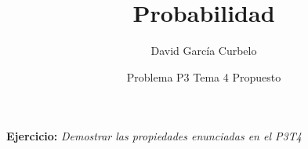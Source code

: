 \documentclass[fleqn]{article}
\author{David García Curbelo}
\title{Probabilidad}
\date{Problema P3 Tema 4 Propuesto}
\begin{document}
    \maketitle
    \setcounter{page}{1}
    \pagestyle{plain}
    
    \textbf{Ejercicio: } \textit{Demostrar las propiedades enunciadas en el P3T4 }
    
    
    
\end{document}
